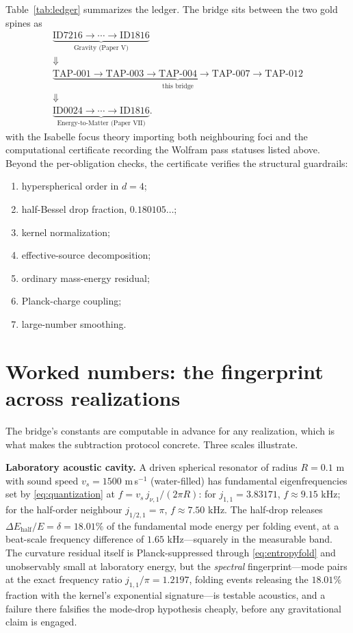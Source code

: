 \documentclass[11pt]{article}
\theoremstyle{remark}
\begin{document}
Table~\ref{tab:ledger} summarizes the ledger. The bridge sits between the two gold spines as
\begin{equation*}
\begin{gathered}
\underbrace{\text{ID7216} \to \cdots \to \text{ID1816}}_{\text{Gravity (Paper V)}}\\
\Downarrow\\
\underbrace{\text{TAP-001} \to \text{TAP-003} \to \text{TAP-004}
\to \text{TAP-007} \to \text{TAP-012}}_{\text{this bridge}}\\
\Downarrow\\
\underbrace{\text{ID0024} \to \cdots \to \text{ID1816}}_{\text{Energy-to-Matter (Paper VII)}}.
\end{gathered}
\end{equation*}
with the Isabelle focus theory importing both neighbouring foci and the computational certificate recording the Wolfram pass statuses listed above. Beyond the per-obligation checks, the certificate verifies the structural guardrails:
\begin{enumerate}
\item hyperspherical order in $d=4$;
\item half-Bessel drop fraction, $0.180105\ldots$;
\item kernel normalization;
\item effective-source decomposition;
\item ordinary mass-energy residual;
\item Planck-charge coupling;
\item large-number smoothing.
\end{enumerate}

\section{Worked numbers: the fingerprint across realizations}
\label{sec:worked}

The bridge's constants are computable in advance for any realization, which is what makes the subtraction protocol concrete. Three scales illustrate.

\textbf{Laboratory acoustic cavity.} A driven spherical resonator of radius $R = 0.1$ m with sound speed $v_s = 1500$ m\,s$^{-1}$ (water-filled) has fundamental eigenfrequencies set by \eqref{eq:quantization} at $f = v_s\, j_{\nu,1}/(2\pi R)$: for $j_{1,1} = 3.83171$, $f \approx 9.15$ kHz; for the half-order neighbour $j_{1/2,1} = \pi$, $f \approx 7.50$ kHz. The half-drop releases $\Delta E_{\mathrm{half}}/E = \delta = 18.01\%$ of the fundamental mode energy per folding event, at a beat-scale frequency difference of $1.65$ kHz---squarely in the measurable band. The curvature residual itself is Planck-suppressed through \eqref{eq:entropyfold} and unobservably small at laboratory energy, but the \emph{spectral} fingerprint---mode pairs at the exact frequency ratio $j_{1,1}/\pi = 1.2197$, folding events releasing the $18.01\%$ fraction with the kernel's exponential signature---is testable acoustics, and a failure there falsifies the mode-drop hypothesis cheaply, before any gravitational claim is engaged.
\end{document}
